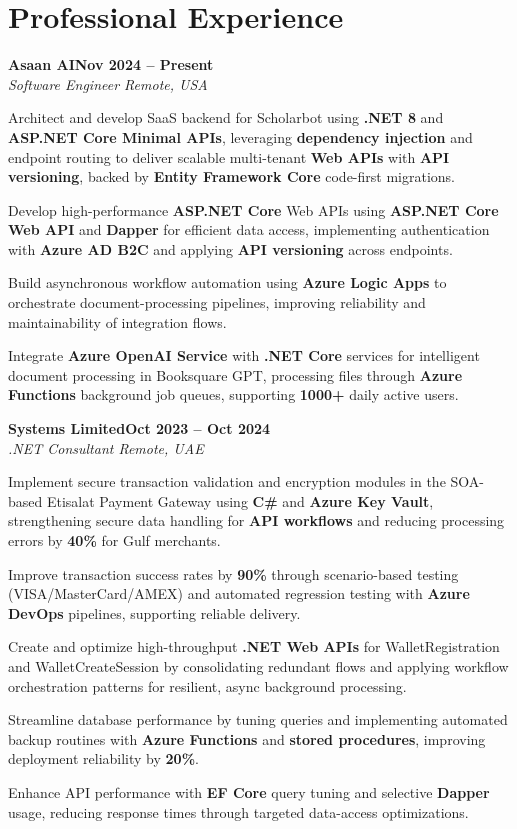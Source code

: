 \documentclass[letterpaper,10pt]{article}
\newcommand{\headingBf}[2]{
  \hspace{10pt}\textbf{#1}\hfill\textbf{#2}\\
}
\newcommand{\headingIt}[2]{
  \hspace{10pt}\textit{#1}\hfill\textit{#2}\\
}
\newenvironment{resume_list}{
  \vspace{-7pt}
  \begin{itemize}[itemsep=-2px, parsep=1pt, leftmargin=30pt]
}{
  \end{itemize}
}
\begin{document}
\section{Professional Experience}

\headingBf{Asaan AI}{Nov 2024 -- Present}
\headingIt{Software Engineer \hfill Remote, USA}{}
\begin{resume_list}
    \item Architect and develop SaaS backend for Scholarbot using \textbf{.NET 8} and \textbf{ASP.NET Core Minimal APIs}, leveraging \textbf{dependency injection} and endpoint routing to deliver scalable multi-tenant \textbf{Web APIs} with \textbf{API versioning}, backed by \textbf{Entity Framework Core} code-first migrations.
    \item Develop high-performance \textbf{ASP.NET Core} Web APIs using \textbf{ASP.NET Core Web API} and \textbf{Dapper} for efficient data access, implementing authentication with \textbf{Azure AD B2C} and applying \textbf{API versioning} across endpoints.
    \item Build asynchronous workflow automation using \textbf{Azure Logic Apps} to orchestrate document-processing pipelines, improving reliability and maintainability of integration flows.
    \item Integrate \textbf{Azure OpenAI Service} with \textbf{.NET Core} services for intelligent document processing in Booksquare GPT, processing files through \textbf{Azure Functions} background job queues, supporting \textbf{1000+} daily active users.
\end{resume_list}

\headingBf{Systems Limited}{Oct 2023 -- Oct 2024}
\headingIt{.NET Consultant \hfill Remote, UAE}{}
\begin{resume_list}
    \item Implement secure transaction validation and encryption modules in the SOA-based Etisalat Payment Gateway using \textbf{C\#} and \textbf{Azure Key Vault}, strengthening secure data handling for \textbf{API workflows} and reducing processing errors by \textbf{40\%} for Gulf merchants.
    \item Improve transaction success rates by \textbf{90\%} through scenario-based testing (VISA/MasterCard/AMEX) and automated regression testing with \textbf{Azure DevOps} pipelines, supporting reliable delivery.
    \item Create and optimize high-throughput \textbf{.NET Web APIs} for WalletRegistration and WalletCreateSession by consolidating redundant flows and applying workflow orchestration patterns for resilient, async background processing.
    \item Streamline database performance by tuning queries and implementing automated backup routines with \textbf{Azure Functions} and \textbf{stored procedures}, improving deployment reliability by \textbf{20\%}.
    \item Enhance API performance with \textbf{EF Core} query tuning and selective \textbf{Dapper} usage, reducing response times through targeted data-access optimizations.
\end{resume_list}
\end{document}
